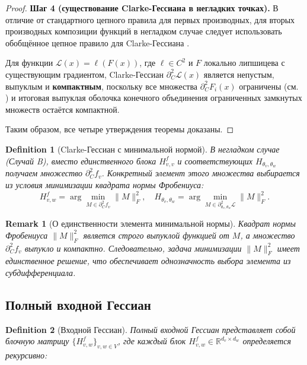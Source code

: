 \documentclass[11pt]{article}
\newtheorem{remark}{Remark}
\newtheorem{definition}{Definition}
\begin{document}
\begin{proof}
  \medskip
  \textbf{Шаг 4 (существование Clarke-Гессиана в негладких точках).}
  В отличие от стандартного цепного правила для первых производных, для вторых
  производных композиции функций в негладком случае следует использовать обобщённое цепное правило для
  Clarke-Гессиана \citep{mordukhovich2012generalized, jeyakumar1999generalized}.

  Для функции $\mathcal L(x) = \ell(F(x))$, где $\ell \in C^2$ и $F$ локально липшицева с существующим
  градиентом, Clarke-Гессиан $\partial_C^2\mathcal L(x)$ является непустым, выпуклым и \textbf{компактным}, поскольку
  все множества $\partial_C^2F_i(x)$ ограничены (см. \cite[Thm 3.46]{mordukhovich2012generalized})
  и итоговая выпуклая оболочка конечного объединения ограниченных замкнутых множеств остаётся компактной.

  \medskip
  Таким образом, все четыре утверждения теоремы доказаны.
\end{proof}

\begin{definition}[Clarke-Гессиан с минимальной нормой]
  В негладком случае (Случай B), вместо единственного блока $H^f_{v,v}$ и соответствующих
  $H_{\theta_v,\theta_w}$ получаем множество $\partial_C^2f_v$. Конкретный элемент этого множества выбирается
  из условия минимизации квадрата нормы Фробениуса:
  \[
    H^f_{v,w}
    = \arg\min_{M\in\partial_C^2 f_v}\|M\|_F^2,
    \quad
    H_{\theta_v,\theta_w}
    = \arg\min_{M\in\partial^2_{\theta_v,\theta_w}\!\mathcal L}\|M\|_F^2.
  \]
\end{definition}

\begin{remark}[О единственности элемента минимальной нормы]
  Квадрат нормы Фробениуса $\|M\|_F^2$ является строго выпуклой функцией от $M$, а множество $\partial_C^2
  f_v$ выпукло и компактно. Следовательно, задача минимизации $\|M\|_F^2$ имеет единственное решение, что
  обеспечивает однозначность выбора элемента из субдифференциала.
\end{remark}

\subsection{Полный входной Гессиан}

\begin{definition}[Входной Гессиан]
  Полный входной Гессиан представляет собой блочную матрицу $\{H^f_{v,w}\}_{v,w\in V}$, где каждый блок
  $H^f_{v,w}\in\mathbb{R}^{d_v\times d_w}$ определяется рекурсивно:
\end{definition}
\end{document}
